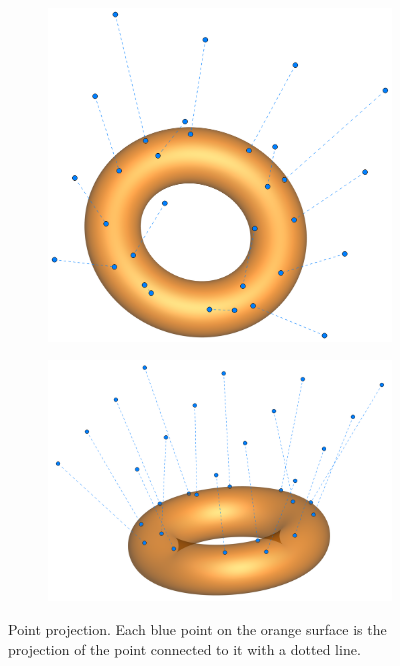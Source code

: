 \documentclass[a4paper, 11pt]{report}
\theoremstyle{definition}
\begin{document}
	\begin{figure}[H]
		\centering
		\begin{subfigure}{.49\textwidth}
			\includegraphics[width=\textwidth]{../tec/projection/02.png}
		\end{subfigure}
		\hspace{0.5cm}
		\begin{subfigure}{.45\textwidth}
			\includegraphics[width=\textwidth]{../tec/projection/01.png}
			\vspace{0.5cm}
		\end{subfigure}
		\caption{Point projection. Each blue point on the orange surface is the projection of the point connected to it with a dotted line.}
	\end{figure}
\end{document}
